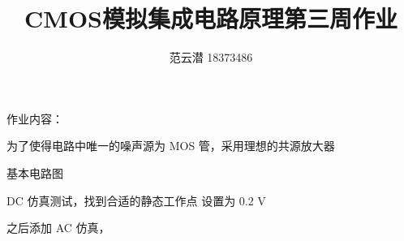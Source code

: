 \documentclass[lang=cn,11pt,a4paper,cite=authoryear]{elegantpaper}
\title{CMOS模拟集成电路原理\quad 第三周作业}
\author{范云潜 18373486}
\institute{微电子学院 184111 班}
\date{\zhtoday}
\begin{document}
\maketitle

作业内容：




为了使得电路中唯一的噪声源为 MOS 管，采用理想的共源放大器

基本电路图 %

DC 仿真测试，找到合适的静态工作点 %
设置为 0.2 V  %

之后添加 AC 仿真，



\end{document}

